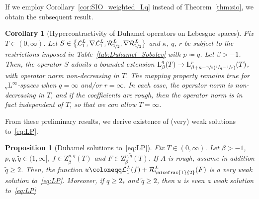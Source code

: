 \documentclass[11pt, leqno]{amsart}
\newtheorem{proposition}[theorem]{Proposition}
\newtheorem{corollary}[theorem]{Corollary}
\theoremstyle{definition}
\renewcommand{\L}{\mathrm{L}}
\newcommand{\Z}{\mathrm{Z}}
\newcommand{\Lv}{{}_\mathrm{v}\mathrm{L}}
\newcommand{\Sol}{\mathcal{R}}
\newcommand{\Soll}{\mathcal{L}}
\begin{document}
	If we employ Corollary~\ref{cor:SIO_weighted_Lq} instead of Theorem~\ref{thm:sio}, we obtain the subsequent result.

	\begin{corollary}[Hypercontractivity of Duhamel operators on Lebesgue spaces]
		\label{cor:Duhamel_Lq}
		Fix $T \in (0,\infty)$. Let $S \in \bigl\{ \Soll^L_1, \nabla \Soll^L_1, \Sol^L_{\nicefrac{1}{2}}, \nabla \Sol^L_{\nicefrac{1}{2}} \bigr\}$ and $\kappa$, $q$, $r$ be subject to the restrictions imposed in Table~\ref{tab:Duhamel_Sobolev} with $p \coloneqq q$. Let $\beta > -1$. Then, the operator $S$ admits a bounded extension $\L^q_\beta(T) \to \L^r_{\beta + \kappa - \nicefrac{n}{2}(\nicefrac{1}{q} - \nicefrac{1}{r})}(T)$, with operator norm non-decreasing in $T$.
		The mapping property remains true for $\Lv^\infty$-spaces when $q=\infty$ and/or $r = \infty$.
		In each case, the operator norm is non-decreasing in $T$, and if the coefficients are rough, then the operator norm is in fact independent of $T$, so that we can allow $T = \infty$.
	\end{corollary}



	From these preliminary results, we derive existence of (very) weak solutions to~\eqref{eq:LP}.

	\begin{proposition}[Duhamel solutions to~\eqref{eq:LP}]
		\label{prop:Duhamel_Z_weak}
		Fix $T \in (0,\infty)$. Let $\beta > -1$, $p,q,\tilde q \in (1,\infty]$, $f \in \Z^{p,q}_\beta(T)$ and $F \in \Z^{p,\tilde q}_\beta(T)$. %
		If $A$ is rough, assume in addition $\tilde q \geq 2$.
		Then, the function $u \coloneqq \Soll^L_1(f) + \Sol^L_{\nicefrac{1}{2}}(F)$ is a very weak solution to~\eqref{eq:LP}.
		Moreover, if $q \geq 2_*$ and $\tilde q \geq 2$, then $u$ is even a weak solution to~\eqref{eq:LP}
	\end{proposition}
\end{document}
